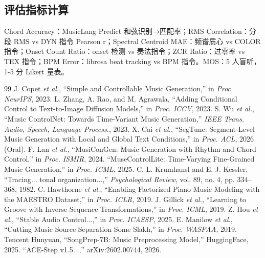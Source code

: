\documentclass[11pt,twocolumn]{article}
\begin{document}
\subsection{评估指标计算}
Chord Accuracy：MusicLang Predict 和弦识别→匹配率；RMS Correlation：分段 RMS vs DYN 指令 Pearson r；Spectral Centroid MAE：频谱质心 vs COLOR 指令；Onset Count Ratio：onset 检测 vs 奏法指令；ZCR Ratio：过零率 vs TEX 指令；BPM Error：librosa beat tracking vs BPM 指令。MOS：5 人盲听，1-5 分 Likert 量表。


\begin{thebibliography}{99}
 J. Copet \textit{et al.}, ``Simple and Controllable Music Generation,'' in \textit{Proc. NeurIPS}, 2023.
 L. Zhang, A. Rao, and M. Agrawala, ``Adding Conditional Control to Text-to-Image Diffusion Models,'' in \textit{Proc. ICCV}, 2023.
 S. Wu \textit{et al.}, ``Music ControlNet: Towards Time-Variant Music Generation,'' \textit{IEEE Trans. Audio, Speech, Language Process.}, 2023.
 X. Cai \textit{et al.}, ``SegTune: Segment-Level Music Generation with Local and Global Text Conditions,'' in \textit{Proc. ACL}, 2026 (Oral).
 F. Lan \textit{et al.}, ``MusiConGen: Music Generation with Rhythm and Chord Control,'' in \textit{Proc. ISMIR}, 2024.
 ``MuseControlLite: Time-Varying Fine-Grained Music Generation,'' in \textit{Proc. ICML}, 2025.
 C. L. Krumhansl and E. J. Kessler, ``Tracing... tonal organization...,'' \textit{Psychological Review}, vol. 89, no. 4, pp. 334--368, 1982.
 C. Hawthorne \textit{et al.}, ``Enabling Factorized Piano Music Modeling with the MAESTRO Dataset,'' in \textit{Proc. ICLR}, 2019.
 J. Gillick \textit{et al.}, ``Learning to Groove with Inverse Sequence Transformations,'' in \textit{Proc. ICML}, 2019.
 Z. Hou \textit{et al.}, ``Stable Audio Control...,'' in \textit{Proc. ICASSP}, 2025.
 E. Manilow \textit{et al.}, ``Cutting Music Source Separation Some Slakh,'' in \textit{Proc. WASPAA}, 2019.
 Tencent Hunyuan, ``SongPrep-7B: Music Preprocessing Model,'' HuggingFace, 2025.
 ``ACE-Step v1.5...,'' arXiv:2602.00744, 2026.
\end{thebibliography}
\end{document}
